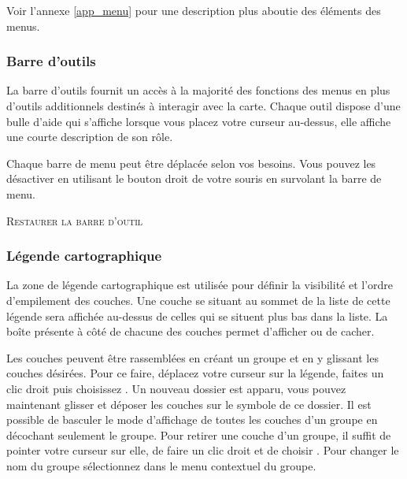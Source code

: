 Voir l'annexe \ref{app_menu} pour une description plus aboutie des éléments des menus.

\subsubsection{Barre d'outils}\label{label_toolbars}

La barre d'outils fournit un accès à la majorité des fonctions des menus en plus d'outils additionnels destinés à interagir avec la carte. Chaque outil dispose d'une bulle d'aide qui s'affiche lorsque vous placez votre curseur au-dessus, elle affiche une courte description de son rôle.

Chaque barre de menu peut être déplacée selon vos besoins. Vous pouvez les désactiver en utilisant le bouton droit de votre souris en survolant la barre de menu.

\begin{Astuce}
\caption{\textsc{Restaurer la barre d'outil}} 
\end{Astuce}

\subsubsection{Légende cartographique}\label{label_legend}

La zone de légende cartographique est utilisée pour définir la visibilité et l'ordre d'empilement des couches. Une couche se situant au sommet de la liste de cette légende sera affichée au-dessus de celles qui se situent plus bas dans la liste. La boîte présente à côté de chacune des couches permet d'afficher ou de cacher.

Les couches peuvent être rassemblées en créant un groupe et en y glissant les couches désirées. Pour ce faire, déplacez votre curseur sur la légende, faites un clic droit puis choisissez . Un nouveau dossier est apparu, vous pouvez maintenant glisser et déposer les couches sur le symbole de ce dossier. Il est possible de basculer le mode d'affichage de toutes les couches d'un groupe en décochant seulement le groupe. Pour retirer une couche d'un groupe, il suffit de pointer votre curseur sur elle, de faire un clic droit et de choisir . Pour changer le nom du groupe sélectionnez  dans le menu contextuel du groupe.

